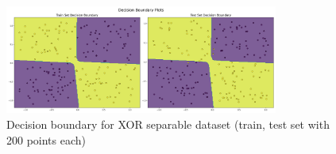 \begin{solve}
\begin{figure}[H]
    \centering
    \includegraphics[width=0.8\textwidth]{plots/3_xor_adam_boundary.png}
    \caption{Decision boundary for XOR separable dataset (train, test set with 200 points each)}
\end{figure}

\end{solve}
